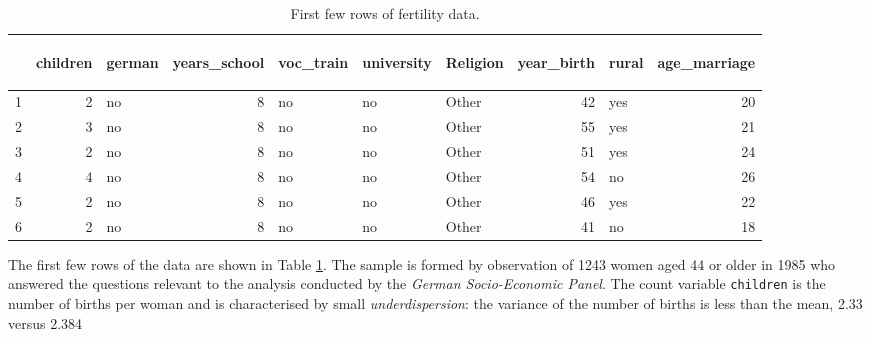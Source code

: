 \documentclass[a4paper,twoside,11pt]{article}
\begin{document}
\begin{table}[ht]
\centering
\begin{tabular}{rrlrlllrlr}
  \hline
 & \begin{sideways} children \end{sideways} & \begin{sideways} german \end{sideways} & \begin{sideways} years\_school \end{sideways} & \begin{sideways} voc\_train \end{sideways} & \begin{sideways} university \end{sideways} & \begin{sideways} Religion \end{sideways} & \begin{sideways} year\_birth \end{sideways} & \begin{sideways} rural \end{sideways} & \begin{sideways} age\_marriage \end{sideways} \\ 
  \hline
1 &   2 & no &   8 & no & no & Other &  42 & yes &  20 \\ 
  2 &   3 & no &   8 & no & no & Other &  55 & yes &  21 \\ 
  3 &   2 & no &   8 & no & no & Other &  51 & yes &  24 \\ 
  4 &   4 & no &   8 & no & no & Other &  54 & no &  26 \\ 
  5 &   2 & no &   8 & no & no & Other &  46 & yes &  22 \\ 
  6 &   2 & no &   8 & no & no & Other &  41 & no &  18 \\ 
   \hline
\end{tabular}
\caption{First few rows of fertility data.} 
\label{tbl:data}
\end{table}

The first few rows of the data are shown in Table \ref{tbl:data}.
The sample is formed by observation of 
1243
women aged 44 or older in 1985 who answered the
questions relevant to the analysis conducted by the \emph{German Socio-Economic
Panel}. The count variable \texttt{children} is the number of births per woman and is
characterised by small \emph{underdispersion}: the variance of the number of births
is less than the mean, 
2.33
versus 
2.384
\end{document}

